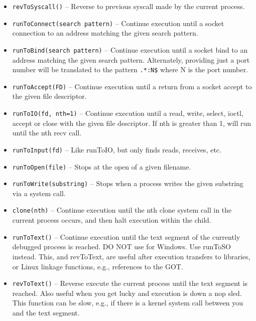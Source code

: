 \documentclass[titlepage]{article}
\begin{document}
\begin{itemize}
\item {\tt revToSyscall()} -- Reverse to previous syscall made by the current process.

\item {\tt runToConnect(search pattern)} – Continue execution until a socket connection to an address matching the given search pattern.

\item {\tt runToBind(search pattern)} – Continue execution until a socket bind to an address matching the given search pattern.  Alternately, providing just
a port number will be translated to the pattern {\tt .*:N\$} where N is the port number.

\item {\tt runToAccept(FD)} – Continue execution until a return from a socket accept to the given file descriptor.

\item {\tt runToIO(fd, nth=1)} – Continue execution until a read, write, select, ioctl, accept or close with the given file descriptor.  
If nth is greater than 1, will run until the nth recv call.  

\item {\tt runToInput(fd)} -- Like runToIO, but only finds reads, receives, etc.

\item {\tt runToOpen(file)} -- Stops at the open of a given filename.

\item {\tt runToWrite(substring)} -- Stops when a process writes the given substring via a system call.

\item {\tt clone(nth)} – Continue execution until the nth clone system call in the current process occurs, and then halt execution within the child.

\item {\tt runToText()} – Continue execution until the text segment of the currently debugged process is reached.  DO NOT use for Windows.  Use runToSO instead. 
This, and revToText, are useful after execution transfers to libraries, or Linux linkage functions, e.g., references to the GOT.

\item {\tt revToText()} – Reverse execute the current process until the text segment is reached.  Also useful when you get lucky and execution is down a nop sled.  This function can be slow, e.g., if there is a kernel system call between you and the text segment.
 

\end{itemize}
\end{document}
